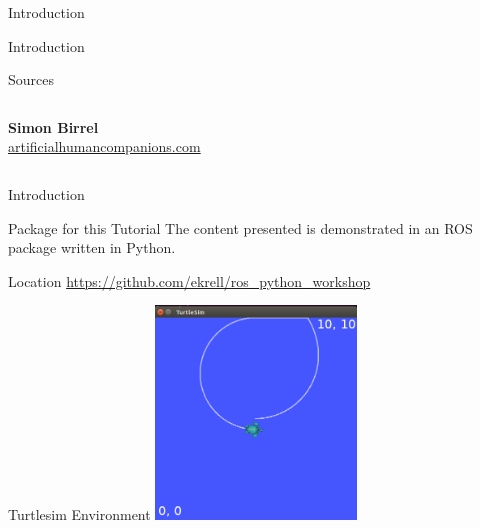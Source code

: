 \documentclass[9pt]{beamer}
\begin{document}
\begin{section}{Introduction}
\begin{frame}{Introduction}
\begin{block}{Sources}
\begin{columns}
\begin{column}{0.5\textwidth}
\begin{center}
                        \textbf{Simon Birrel} \\
                        \url{artificialhumancompanions.com}
                    \end{center}
                \end{column}    
            \end{columns}
        \end{block}
    \end{frame}
    \begin{frame}{Introduction}
        \begin{block}{Package for this Tutorial}
            The content presented is demonstrated in an ROS package written in Python.
        \end{block}
        \begin{block}{Location}
            \url{https://github.com/ekrell/ros_python_workshop}
        \end{block}
        \begin{block}{Turtlesim Environment}
                \includegraphics[width=0.4\textwidth,trim={0cm 0cm 0cm 0cm},clip]{img/turtlesim.png}
        \end{block}
    \end{frame}
\end{section}
\end{document}
